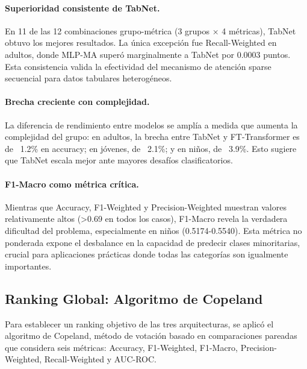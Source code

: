 \documentclass[12pt,a4paper]{article}
\begin{document}
\paragraph{Superioridad consistente de TabNet.} En 11 de las 12 combinaciones grupo-métrica (3 grupos × 4 métricas), TabNet obtuvo los mejores resultados. La única excepción fue Recall-Weighted en adultos, donde MLP-MA superó marginalmente a TabNet por 0.0003 puntos. Esta consistencia valida la efectividad del mecanismo de atención sparse secuencial para datos tabulares heterogéneos.

\paragraph{Brecha creciente con complejidad.} La diferencia de rendimiento entre modelos se amplía a medida que aumenta la complejidad del grupo: en adultos, la brecha entre TabNet y FT-Transformer es de ~1.2\% en accuracy; en jóvenes, de ~2.1\%; y en niños, de ~3.9\%. Esto sugiere que TabNet escala mejor ante mayores desafíos clasificatorios.

\paragraph{F1-Macro como métrica crítica.} Mientras que Accuracy, F1-Weighted y Precision-Weighted muestran valores relativamente altos (>0.69 en todos los casos), F1-Macro revela la verdadera dificultad del problema, especialmente en niños (0.5174-0.5540). Esta métrica no ponderada expone el desbalance en la capacidad de predecir clases minoritarias, crucial para aplicaciones prácticas donde todas las categorías son igualmente importantes.


\subsection{Ranking Global: Algoritmo de Copeland}

Para establecer un ranking objetivo de las tres arquitecturas, se aplicó el algoritmo de Copeland, método de votación basado en comparaciones pareadas que considera seis métricas: Accuracy, F1-Weighted, F1-Macro, Precision-Weighted, Recall-Weighted y AUC-ROC.
\end{document}
